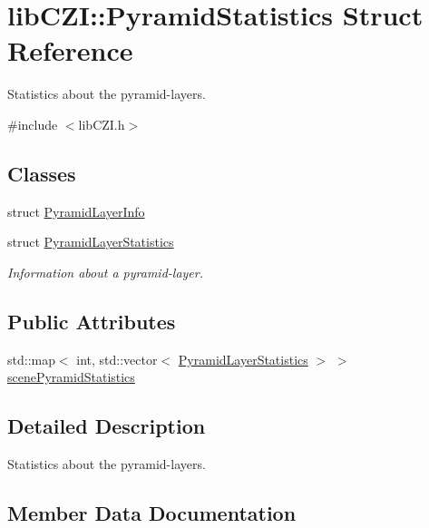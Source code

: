 \hypertarget{structlib_c_z_i_1_1_pyramid_statistics}{}\section{lib\+C\+ZI\+:\+:Pyramid\+Statistics Struct Reference}
\label{structlib_c_z_i_1_1_pyramid_statistics}


Statistics about the pyramid-\/layers.  




{\ttfamily \#include $<$lib\+C\+Z\+I.\+h$>$}

\subsection*{Classes}
\begin{DoxyCompactItemize}
\item 
struct \hyperlink{structlib_c_z_i_1_1_pyramid_statistics_1_1_pyramid_layer_info}{Pyramid\+Layer\+Info}
\item 
struct \hyperlink{structlib_c_z_i_1_1_pyramid_statistics_1_1_pyramid_layer_statistics}{Pyramid\+Layer\+Statistics}
\begin{DoxyCompactList}\small\item\em Information about a pyramid-\/layer. \end{DoxyCompactList}\end{DoxyCompactItemize}
\subsection*{Public Attributes}
\begin{DoxyCompactItemize}
\item 
std\+::map$<$ int, std\+::vector$<$ \hyperlink{structlib_c_z_i_1_1_pyramid_statistics_1_1_pyramid_layer_statistics}{Pyramid\+Layer\+Statistics} $>$ $>$ \hyperlink{structlib_c_z_i_1_1_pyramid_statistics_a07ba65bd447d746f10ab578060d25959}{scene\+Pyramid\+Statistics}
\end{DoxyCompactItemize}


\subsection{Detailed Description}
Statistics about the pyramid-\/layers. 

\subsection{Member Data Documentation}
\mbox{\label{structlib_c_z_i_1_1_pyramid_statistics_a07ba65bd447d746f10ab578060d25959}} 
